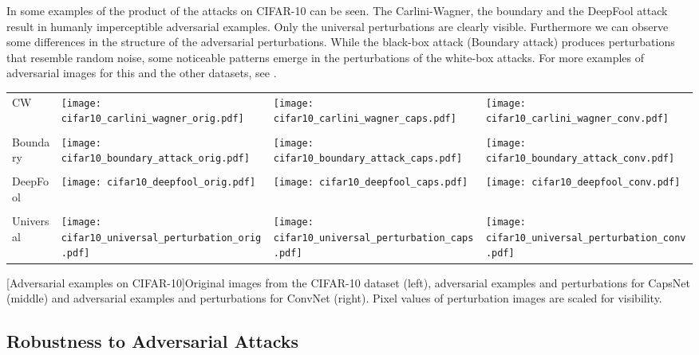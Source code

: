 In  some examples of the product of the attacks on CIFAR-10 can be seen.
The Carlini-Wagner, the boundary and the DeepFool attack result in humanly imperceptible adversarial examples.
Only the universal perturbations are clearly visible.
Furthermore we can observe some differences in the structure of the adversarial perturbations.
While the black-box attack (Boundary attack) produces perturbations that resemble random noise, some noticeable patterns emerge in the perturbations of the white-box attacks.
For more examples of adversarial images for this and the other datasets, see .

\begin{center}
\begin{longtable*}{m{1.6cm}m{2.2cm}m{4.2cm}m{4.2cm}}
	\raggedleft CW & 
	\texttt{[image: cifar10\_carlini\_wagner\_orig.pdf]} & \texttt{[image: cifar10\_carlini\_wagner\_caps.pdf]} & \texttt{[image: cifar10\_carlini\_wagner\_conv.pdf]}\\
	\\
	\raggedleft Boundary &
	\texttt{[image: cifar10\_boundary\_attack\_orig.pdf]} & \texttt{[image: cifar10\_boundary\_attack\_caps.pdf]} & \texttt{[image: cifar10\_boundary\_attack\_conv.pdf]}\\
	\\
	\raggedleft DeepFool&
	\texttt{[image: cifar10\_deepfool\_orig.pdf]} & \texttt{[image: cifar10\_deepfool\_caps.pdf]} & \texttt{[image: cifar10\_deepfool\_conv.pdf]}\\
	\\
	\raggedleft Universal&
	\texttt{[image: cifar10\_universal\_perturbation\_orig.pdf]} & \texttt{[image: cifar10\_universal\_perturbation\_caps.pdf]} & \texttt{[image: cifar10\_universal\_perturbation\_conv.pdf]}
\end{longtable*}
[Adversarial examples on CIFAR-10]{Original images from the CIFAR-10 dataset (left), adversarial examples and perturbations for CapsNet (middle) and adversarial examples and perturbations for ConvNet (right). Pixel values of perturbation images are scaled for visibility.}
\label{fig:images}
\end{center}

\subsection{Robustness to Adversarial Attacks}

